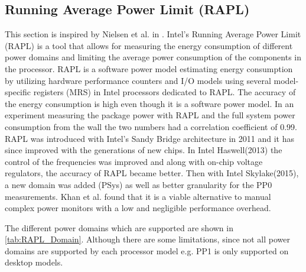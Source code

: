 \subsection{Running Average Power Limit (RAPL)}\label{subsec:rapl}
This section is inspired by Nielsen et al. in \cite{Doom2021}.
Intel's Running Average Power Limit (RAPL) is a tool that allows for measuring the energy consumption of different power domains and limiting the average power consumption of the components in the processor. RAPL is a software power model estimating energy consumption by utilizing hardware performance counters and I/O models using several model-specific registers (MRS) in Intel processors dedicated to RAPL.\cite{Power-Management_Sandy_Bridge,Zhang2021} The accuracy of the energy consumption is high even though it is a software power model\cite{RAPL_ACU1,hackenberg2013}. In an experiment measuring the package power with RAPL and the full system power consumption from the wall the two numbers had a correlation coefficient of 0.99.\cite{RAPL_in_action} RAPL was introduced with Intel's Sandy Bridge architecture in 2011 and it has since improved with the generations of new chips. In Intel Haswell(2013) the control of the frequencies was improved and along with on-chip voltage regulators, the accuracy of RAPL became better. Then with Intel Skylake(2015), a new domain was added (PSys) as well as better granularity for the PP0 measurements. Khan et al. found that it is a viable alternative to manual complex power monitors with a low and negligible performance overhead. \cite{RAPL_in_action}

The different power domains which are supported are shown in \cref{tab:RAPL_Domain}. Although there are some limitations, since not all power domains are supported by each processor model e.g. PP1 is only supported on desktop models.

